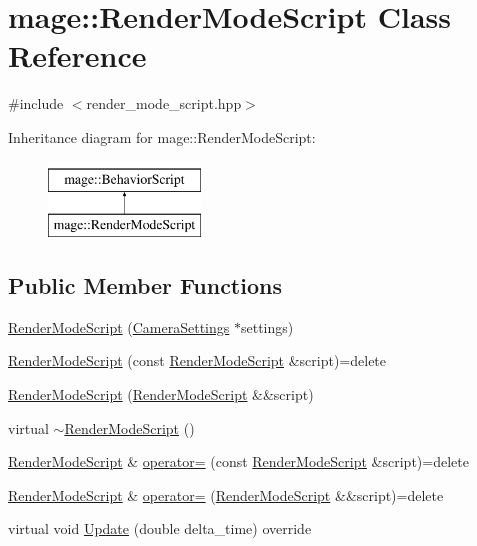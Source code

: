 \hypertarget{classmage_1_1_render_mode_script}{}\section{mage\+:\+:Render\+Mode\+Script Class Reference}
\label{classmage_1_1_render_mode_script}


{\ttfamily \#include $<$render\+\_\+mode\+\_\+script.\+hpp$>$}

Inheritance diagram for mage\+:\+:Render\+Mode\+Script\+:\begin{figure}[H]
\begin{center}
\leavevmode
\includegraphics[height=2.000000cm]{classmage_1_1_render_mode_script}
\end{center}
\end{figure}
\subsection*{Public Member Functions}
\begin{DoxyCompactItemize}
\item 
\hyperlink{classmage_1_1_render_mode_script_a313a1819a7d769199fe19a0573761e31}{Render\+Mode\+Script} (\hyperlink{structmage_1_1_camera_settings}{Camera\+Settings} $\ast$settings)
\item 
\hyperlink{classmage_1_1_render_mode_script_ac6b9d813ff57646b4bdcded5f1efdfb1}{Render\+Mode\+Script} (const \hyperlink{classmage_1_1_render_mode_script}{Render\+Mode\+Script} \&script)=delete
\item 
\hyperlink{classmage_1_1_render_mode_script_aafc57a9e0066734f91db798577ee3edb}{Render\+Mode\+Script} (\hyperlink{classmage_1_1_render_mode_script}{Render\+Mode\+Script} \&\&script)
\item 
virtual \hyperlink{classmage_1_1_render_mode_script_a9fac374686ee177e8272b4b7ea8f83a3}{$\sim$\+Render\+Mode\+Script} ()
\item 
\hyperlink{classmage_1_1_render_mode_script}{Render\+Mode\+Script} \& \hyperlink{classmage_1_1_render_mode_script_a0b81f5f341f48954e18b1a81c36a0263}{operator=} (const \hyperlink{classmage_1_1_render_mode_script}{Render\+Mode\+Script} \&script)=delete
\item 
\hyperlink{classmage_1_1_render_mode_script}{Render\+Mode\+Script} \& \hyperlink{classmage_1_1_render_mode_script_a8ca48ab27bef55314b1a822b827153b2}{operator=} (\hyperlink{classmage_1_1_render_mode_script}{Render\+Mode\+Script} \&\&script)=delete
\item 
virtual void \hyperlink{classmage_1_1_render_mode_script_a13d76eb4e8362cb519cc3cf98102094f}{Update} (double delta\+\_\+time) override
\end{DoxyCompactItemize}
